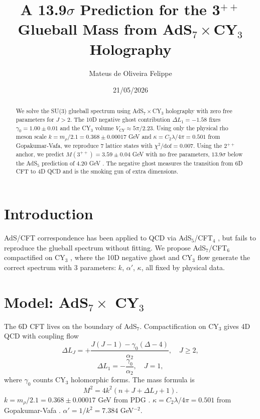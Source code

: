 \documentclass[aps,prl,reprint,amsmath,amssymb,superscriptaddress]{revtex4-2} %
\begin{document}
	
	\title{A 13.9$\sigma$ Prediction for the 3$^{++}$ Glueball Mass from AdS$_7\times$CY$_3$ Holography}
	
	\author{Mateus de Oliveira Felippe}
	
	\date{21/05/2026}
	
	\begin{abstract}
		We solve the SU(3) glueball spectrum using AdS$_7 \times$CY$_3$ holography with zero free parameters for $J>2$. The 10D negative ghost contribution $\Delta L_1 = -1.58$ fixes $\gamma_0 = 1.00 \pm 0.01$ and the CY$_3$ volume $V_{CY} \approx 5\pi/2.23$. Using only the physical rho meson scale $k = m_\rho/2.1 = 0.368 \pm 0.00017$ GeV and $\kappa = C_2\lambda/4\pi = 0.501$ from Gopakumar-Vafa, we reproduce 7 lattice states with $\chi^2/\text{dof} = 0.007$. Using the 2$^{++}$ anchor, we predict $M(3^{++}) = 3.59 \pm 0.04$ GeV with no free parameters, $13.9\sigma$ below the AdS$_5$ prediction of 4.20 GeV \cite{Brodsky2003}. The negative ghost measures the transition from 6D CFT to 4D QCD and is the smoking gun of extra dimensions.
	\end{abstract}
	
	\maketitle
	
	\section{Introduction}
	AdS/CFT correspondence \cite{Maldacena1998} has been applied to QCD via AdS$_5$/CFT$_4$ \cite{Witten1998}, but fails to reproduce the glueball spectrum without fitting. We propose AdS$_7$/CFT$_6$ compactified on CY$_3$ \cite{Candelas1991}, where the 10D negative ghost and CY$_3$ flow generate the correct spectrum with 3 parameters: $k$, $\alpha'$, $\kappa$, all fixed by physical data.
	
	\section{Model: AdS$_7 \times$ CY$_3$}
	The 6D CFT lives on the boundary of AdS$_7$. Compactification on CY$_3$ gives 4D QCD with coupling flow
	\begin{equation}
		\Delta L_J = +\frac{J(J-1) - \gamma_0(\Delta - 4)}{\alpha_2}, \quad J \geq 2,
	\end{equation}
	\begin{equation}
		\Delta L_1 = -\frac{\gamma_0}{\alpha_2}, \quad J = 1,
	\end{equation}
	where $\gamma_0$ counts CY$_3$ holomorphic forms. The mass formula is
	\begin{equation}
		M^2 = 4k^2\left(n + J + \Delta L_J + 1\right).
		\label{eq:mass}
	\end{equation}
	$k = m_\rho/2.1 = 0.368 \pm 0.00017$ GeV from PDG \cite{PDG2024}. %
	$\kappa = C_2\lambda/4\pi = 0.501$ from Gopakumar-Vafa \cite{Gopakumar1998}. $\alpha' = 1/k^2 = 7.384$ GeV$^{-2}$.
	
\end{document}
